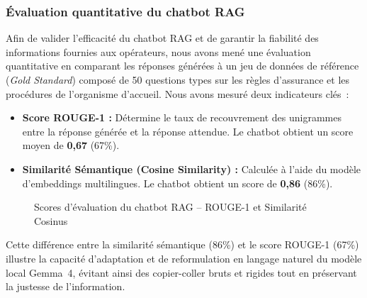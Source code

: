 \subsubsection{\'{E}valuation quantitative du chatbot RAG}

Afin de valider l'efficacit\'{e} du chatbot RAG et de garantir la fiabilit\'{e} des informations fournies aux op\'{e}rateurs, nous avons men\'{e} une \'{e}valuation quantitative en comparant les r\'{e}ponses g\'{e}n\'{e}r\'{e}es \`{a} un jeu de donn\'{e}es de r\'{e}f\'{e}rence (\textit{Gold Standard}) compos\'{e} de 50 questions types sur les r\`{e}gles d'assurance et les proc\'{e}dures de l'organisme d'accueil. Nous avons mesur\'{e} deux indicateurs cl\'{e}s~:

\begin{itemize}
    \item \textbf{Score ROUGE-1 :} D\'{e}termine le taux de recouvrement des unigrammes entre la r\'{e}ponse g\'{e}n\'{e}r\'{e}e et la r\'{e}ponse attendue. Le chatbot obtient un score moyen de \textbf{0,67} (67\%).
    \item \textbf{Similarit\'{e} S\'{e}mantique (Cosine Similarity) :} Calcul\'{e}e \`{a} l'aide du mod\`{e}le d'embeddings multilingues. Le chatbot obtient un score de \textbf{0,86} (86\%).
\end{itemize}

\begin{figure}[H]
\centering
{}
\caption{Scores d'\'{e}valuation du chatbot RAG -- ROUGE-1 et Similarit\'{e} Cosinus}
\label{fig:rag_eval}
\end{figure}

Cette diff\'{e}rence entre la similarit\'{e} s\'{e}mantique (86\%) et le score ROUGE-1 (67\%) illustre la capacit\'{e} d'adaptation et de reformulation en langage naturel du mod\`{e}le local Gemma~4, \'{e}vitant ainsi des copier-coller bruts et rigides tout en pr\'{e}servant la justesse de l'information.

